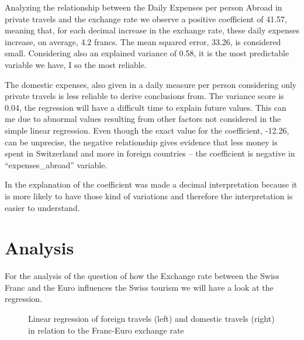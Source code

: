 \documentclass[12pt,a4paper,bibliography=totocnumbered,listof=totocnumbered]{scrartcl}
\begin{document}
Analyzing the relationship between the Daily Expenses per person Abroad in private travels and the exchange rate we observe a positive coefficient of 41.57, meaning that, for each decimal increase in the exchange rate, these daily expenses increase, on average, 4.2 francs. The mean squared error, 33.26, is considered small. Considering also an explained variance of 0.58, it is the most predictable variable we have, I so the most reliable. 

The domestic expenses, also given in a daily measure per person considering only private travels is less reliable to derive conclusions from. The variance score is 0.04, the regression will have a difficult time to explain future values. This can me due to abnormal values resulting from other factors not considered in the simple linear regression. Even though the exact value for the coefficient, -12.26, can be unprecise, the negative relationship gives evidence that less money is spent in Switzerland and more in foreign countries – the coefficient is negative in “expenses_abroad” variable. 

In the explanation of the coefficient was made a decimal interpretation because it is more likely to have those kind of variations and therefore the interpretation is easier to understand.   

\section{Analysis}
For the analysis of the question of how the Exchange rate between the Swiss Franc and the Euro influences the Swiss tourism we will have a look at the regression. 


\begin{figure}
\centering
     \qquad
\caption{Linear regression of foreign travels (left) and domestic travels (right) in relation to the Franc-Euro exchange rate}
\end{figure}
\end{document}
